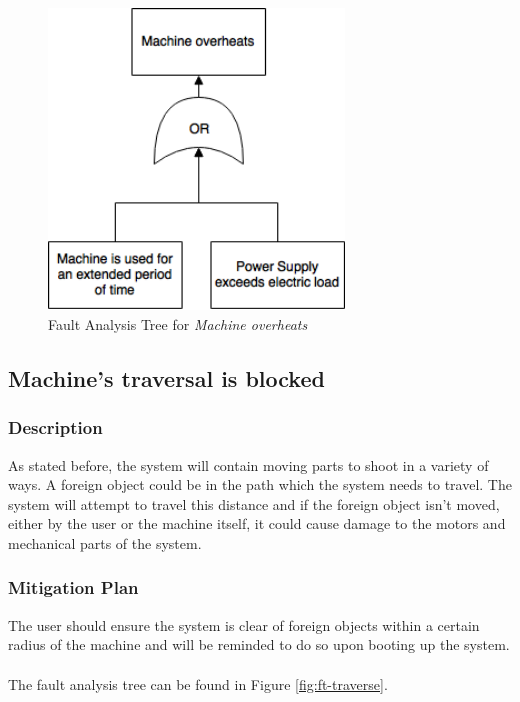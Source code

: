 \documentclass[11pt]{article}
\begin{document}
\begin{figure}[H]
   \centering
   \includegraphics[width=0.7\textwidth]{img/ft-overheat.png} %
   \caption{Fault Analysis Tree for \textit{Machine overheats}}
   \label{fig:ft-overheat}
\end{figure}

\subsection{Machine's traversal is blocked}
\subsubsection*{Description}
As stated before, the system will contain moving parts to shoot in a variety of ways. A foreign object could be in the path which the system needs to travel. The system will attempt to travel this distance and if the foreign object isn't moved, either by the user or the machine itself, it could cause damage to the motors and mechanical parts of the system.
\subsubsection*{Mitigation Plan}
The user should ensure the system is clear of foreign objects within a certain radius of the machine and will be reminded to do so upon booting up the system. \\ \\

The fault analysis tree can be found in Figure \ref{fig:ft-traverse}.
\end{document}

